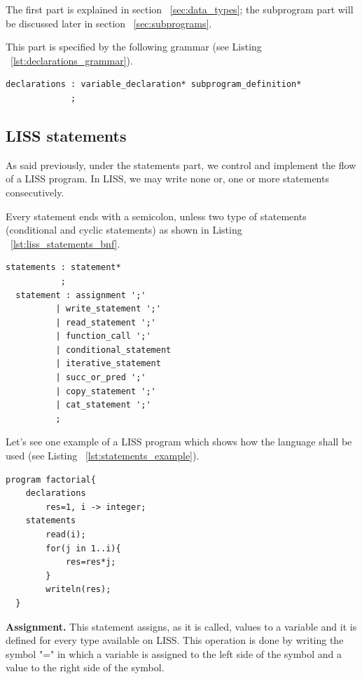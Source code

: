\documentclass[
  oneside,
  11pt, a4paper,
  footinclude=true,
  headinclude=true,
  cleardoublepage=empty
]{scrbook}
\begin{document}
The first part is explained in section ~\ref{sec:data_types}; the subprogram part will be discussed later in section ~\ref{sec:subprograms}.

This part is specified by the following grammar (see Listing ~\ref{lst:declarations_grammar}).

\begin{lstlisting}[caption={CFG for declarations in LISS},label={lst:declarations_grammar}]
  declarations : variable_declaration* subprogram_definition*
             ;
\end{lstlisting}

\subsection{LISS statements}

As said previously, under the statements part, we control and implement the flow of a LISS program.
In LISS, we may write none or, one or more statements consecutively.

Every statement ends with a semicolon, unless two type of statements (conditional and cyclic statements) as shown in Listing ~\ref{lst:liss_statements_bnf}.

\begin{lstlisting}[caption={CFG for statements in LISS},label={lst:liss_statements_bnf}]
  statements : statement*
           ;
  statement : assignment ';'
          | write_statement ';'
          | read_statement ';'
          | function_call ';'
          | conditional_statement
          | iterative_statement
          | succ_or_pred ';'
          | copy_statement ';'
          | cat_statement ';'
          ;
\end{lstlisting}

Let's see one example of a LISS program which shows how the language shall be used (see Listing ~\ref{lst:statements_example}).

\begin{lstlisting}[caption={Example of using statements in LISS},label={lst:statements_example}]
  program factorial{
    declarations
        res=1, i -> integer;
    statements
        read(i);
        for(j in 1..i){
            res=res*j;
        }
        writeln(res);
  }
\end{lstlisting}

\textbf{Assignment.} This statement assigns, as it is called, values to a variable and it is defined for every type available on LISS.
This operation is done by writing the symbol "=" in which a variable is assigned to the left side of the symbol and a value to the right side of the symbol.
\end{document}
